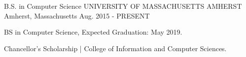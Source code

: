 \begin{cventries}
  \cventry
    {B.S. in Computer Science}
    {UNIVERSITY OF MASSACHUSETTS AMHERST}
    {Amherst, Massachusetts}
    {Aug. 2015 - PRESENT}
    {
      \begin{cvitems}
        \item {BS in Computer Science, Expected Graduation: May 2019.}
        \item {Chancellor’s Scholarship | College of Information and Computer Sciences.}
      \end{cvitems}
    }
\end{cventries}
